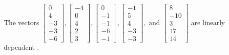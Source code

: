 \begin{exercise}
\begin{exerciseStatement}
  \end{exerciseStatement}
  \begin{exerciseAnswer}
   The vectors \(\left[\begin{array}{r}
0 \\
4 \\
-3 \\
-3 \\
-6
\end{array}\right] , \left[\begin{array}{r}
-4 \\
0 \\
4 \\
2 \\
3
\end{array}\right] , \left[\begin{array}{r}
0 \\
-1 \\
-1 \\
-6 \\
-1
\end{array}\right] , \left[\begin{array}{r}
-1 \\
5 \\
4 \\
-3 \\
-3
\end{array}\right] , \text{ and } \left[\begin{array}{r}
8 \\
-10 \\
3 \\
17 \\
14
\end{array}\right]\) are 
  	 linearly dependent  .
  


  \end{exerciseAnswer}
\end{exercise}